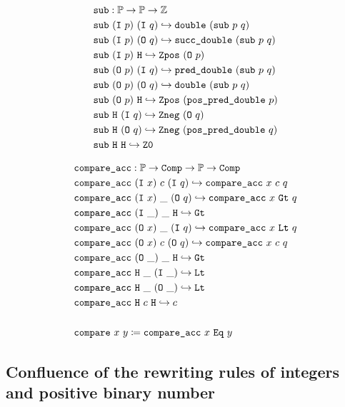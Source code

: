 \begin{align*}
&\texttt{sub} : \mathbb{P} \rightarrow \mathbb{P} \rightarrow \mathbb{Z} \\
& \texttt{sub}~(\texttt{I}~p)~(\texttt{I}~q) \hookrightarrow \texttt{double}~(\texttt{sub}~p~q) \\
& \texttt{sub}~(\texttt{I}~p)~(\texttt{O}~q) \hookrightarrow \texttt{succ\_double}~(\texttt{sub}~p~q) \\
& \texttt{sub}~(\texttt{I}~p)~\texttt{H} \hookrightarrow \texttt{Zpos}~(\texttt{O}~p) \\
& \texttt{sub}~(\texttt{O}~p)~(\texttt{I}~q) \hookrightarrow \texttt{pred\_double}~(\texttt{sub}~p~q) \\
& \texttt{sub}~(\texttt{O}~p)~(\texttt{O}~q) \hookrightarrow \texttt{double}~(\texttt{sub}~p~q) \\
& \texttt{sub}~(\texttt{O}~p)~\texttt{H} \hookrightarrow \texttt{Zpos}~(\texttt{pos\_pred\_double}~p) \\
& \texttt{sub}~\texttt{H}~(\texttt{I}~q) \hookrightarrow \texttt{Zneg}~(\texttt{O}~q) \\
& \texttt{sub}~\texttt{H}~(\texttt{O}~q) \hookrightarrow \texttt{Zneg}~(\texttt{pos\_pred\_double}~q) \\
& \texttt{sub}~\texttt{H}~\texttt{H} \hookrightarrow \texttt{Z0} \\
\end{align*}

\begin{align*}
&\texttt{compare\_acc} : \mathbb{P} \rightarrow \texttt{Comp} \rightarrow \mathbb{P} \rightarrow \texttt{Comp} \\
& \texttt{compare\_acc}~(\texttt{I}~x)~c~(\texttt{I}~q) \hookrightarrow \texttt{compare\_acc}~x~c~q \\
& \texttt{compare\_acc}~(\texttt{I}~x)~\_~(\texttt{O}~q) \hookrightarrow \texttt{compare\_acc}~x~\texttt{Gt}~q \\
& \texttt{compare\_acc}~(\texttt{I}~\_)~\_~\texttt{H} \hookrightarrow \texttt{Gt} \\
& \texttt{compare\_acc}~(\texttt{O}~x)~\_~(\texttt{I}~q) \hookrightarrow \texttt{compare\_acc}~x~\texttt{Lt}~q \\
& \texttt{compare\_acc}~(\texttt{O}~x)~c~(\texttt{O}~q) \hookrightarrow \texttt{compare\_acc}~x~c~q \\
& \texttt{compare\_acc}~(\texttt{O}~\_)~\_~\texttt{H} \hookrightarrow \texttt{Gt} \\
& \texttt{compare\_acc}~\texttt{H}~\_~(\texttt{I}~\_) \hookrightarrow \texttt{Lt} \\
& \texttt{compare\_acc}~\texttt{H}~\_~(\texttt{O}~\_) \hookrightarrow \texttt{Lt} \\
& \texttt{compare\_acc}~\texttt{H}~c~\texttt{H} \hookrightarrow c \\
\\
&\texttt{compare}~x~y \coloneq \texttt{compare\_acc}~x~\texttt{Eq}~y \\
\end{align*}
  
\subsection{Confluence of the rewriting rules of integers and positive binary number}
\label{app:confluence-int-pos}


